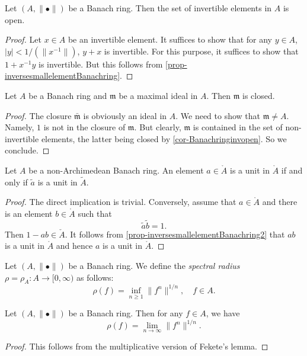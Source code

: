 \begin{corollary}\label{cor-Banachringinvopen}
    Let $(A,\|\bullet\|)$ be a Banach ring. Then the set of invertible elements in $A$ is open.
\end{corollary}
\begin{proof}
    Let $x\in A$ be an invertible element. It suffices to show that for any $y\in A$, $|y|<1/(\|x^{-1}\|)$, $y+x$ is invertible. For this purpose, it suffices to show that $1+x^{-1}y$ is invertible. But this follows from \cref{prop-inversesmallelementBanachring}.
\end{proof}

\begin{corollary}\label{cor:maximalidealclosedinBanachring}
    Let $A$ be a Banach ring and $\mathfrak{m}$ be a maximal ideal in $A$. Then $\mathfrak{m}$ is closed.
\end{corollary}
\begin{proof}
    The closure $\bar{\mathfrak{m}}$ is obviously an ideal in $A$. We need to show that $\mathfrak{m}\neq A$. Namely, $1$ is not in the closure of $\mathfrak{m}$. But clearly, $\mathfrak{m}$ is contained in the set of non-invertible elements, the latter being closed by \cref{cor-Banachringinvopen}. So we conclude.
\end{proof}

\begin{lemma}\label{lma-unitmoduloreduction}
    Let $A$ be a non-Archimedean Banach ring. An element $a\in \mathring{A}$ is a unit in $\mathring{A}$ if and only if $\tilde{a}$ is a unit in $\tilde{A}$.
\end{lemma}
\begin{proof}
    The direct implication is trivial. Conversely, assume that $a\in \mathring{A}$ and there is an element $b\in \mathring{A}$ such that
    \[
        \tilde{a}\tilde{b}=1.  
    \]
    Then $1-ab\in \check{A}$. It follows from \cref{prop-inversesmallelementBanachring2} that $ab$ is a unit in $\mathring{A}$ and hence $a$ is a unit in $\mathring{A}$.
\end{proof}

\begin{definition}\label{def-spectralradius}
    Let $(A,\|\bullet\|)$ be a Banach ring. We define the \emph{spectral radius} $\rho=\rho_A:A\rightarrow [0,\infty)$ as follows:
    \[
        \rho(f)=\inf_{n\geq 1} \|f^n\|^{1/n},\quad f\in A.
    \]
\end{definition}

\begin{lemma}
    Let $(A,\|\bullet\|)$ be a Banach ring. Then for any $f\in A$, we have 
    \[
        \rho(f)=  \lim_{n\to \infty} \|f^n\|^{1/n}.
    \]
\end{lemma}
\begin{proof}
    This follows from the multiplicative version of Fekete's lemma.
\end{proof}





